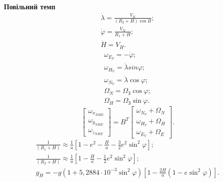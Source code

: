 \textbf{Повільний темп}
\begin{equation} 
\label{eq:geocord} 
\begin{array}{l} 
{\dot{\lambda}=\frac{V_{E}}{(R_{2}+H)\cos B};} \\ 
{\dot{\varphi}=\frac{V_{N}}{R_{1}+H} ;} \\ 
{\dot{H}=V_{H}.} 
\end{array} 
\end{equation} 
\begin{equation} 
\label{eq:__8_26_} 
\begin{array}{l} 
{\omega_{E_{V}} =-\dot{\varphi};} \\ 
{\omega_{H_{V}} =\dot{\lambda}{sin}\varphi;} \\ 
{\omega_{N_{V}} =\dot{\lambda}\cos \varphi;} \\ 
{\Omega_{N} =\Omega_{\text{З}}\cos \varphi;} \\ 
{\Omega_{H} =\Omega_{\text{З}}\sin \varphi.} 
\end{array} 
\end{equation} 
\begin{equation} 
\label{eq:lomega}
\left[\begin{array}{c} 
{\omega_{x_{NHE}}} \\ 
{\omega_{y_{NHE}}} \\ 
{\omega_{z_{NHE}}} \end{array}\right]=B^{T} 
\left[\begin{array}{c} 
{\omega_{N_{V}} +\Omega_{N}} \\ 
{\omega_{H_{V}} +\Omega_{H}} \\ 
{\omega_{E_{V}} +\Omega_{E}} 
\end{array}\right].
\end{equation}
\begin{equation} 
\label{eq:gravity} 
\begin{array}{l}{\frac{1}{(R_{1} +H)} \approx \frac{1}{a}\left[1-e^{2} -\frac{H}{a} -\frac{3}{2} e^{2} \sin ^{2} \varphi\right];} \\ 
{\frac{1}{(R_{2} +H)} \approx \frac{1}{a} \left[1-\frac{H}{a} -\frac{1}{2} e^{2} \sin ^{2}\varphi\right]  ;} \\ 
{g_{H} =-g\left(1+5,2884\cdot 10^{-3} \sin ^{2}\varphi \right)\left[1-\frac{2H}{a} \left(1-e\sin ^{2}\varphi \right)\right].} 
\end{array} 
\end{equation} 








